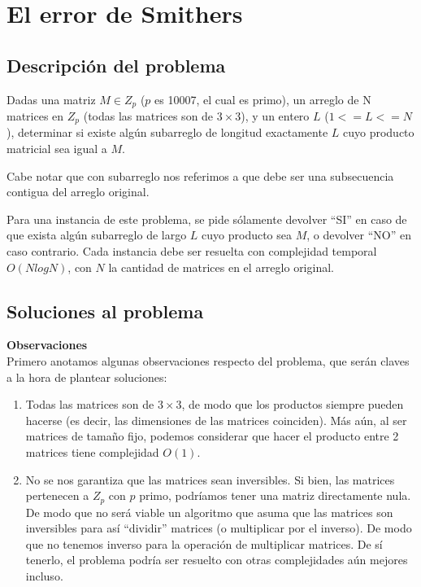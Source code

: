 \newpage{}
\section{El error de Smithers}
\subsection{Descripción del problema}
Dadas una matriz $M\in Z_p$ ($p$ es 10007, el cual es primo), un arreglo 
de N matrices en $Z_p$ (todas las matrices son de $3 \times 3$), 
y un entero $L$ ($1 <= L <= N$), determinar si existe algún subarreglo 
de longitud exactamente $L$ cuyo producto matricial 
sea igual a $M$. 

Cabe notar que con subarreglo nos referimos a que debe ser una 
subsecuencia contigua del arreglo original. 

Para una instancia de este problema, se pide sólamente devolver ``SI'' en 
caso de que exista algún subarreglo de largo $L$ cuyo producto sea $M$, o devolver 
``NO'' en caso contrario. Cada instancia debe ser resuelta con complejidad temporal 
$O(N log N)$, con $N$ 
la cantidad de matrices en el arreglo original. 

\subsection{Soluciones al problema}
\textbf{Observaciones}\\

Primero anotamos algunas observaciones respecto del problema, que serán claves a la
hora de plantear soluciones: 
\begin{enumerate}
    \item Todas las matrices son de $3 \times 3$, de modo que los productos siempre pueden 
    hacerse (es decir, las dimensiones de las matrices coinciden). Más aún, al ser matrices 
    de tamaño fijo, podemos considerar que hacer el producto entre 2 matrices tiene 
    complejidad $O(1)$. 
    \item No se nos garantiza que las matrices sean inversibles. Si bien, las matrices 
    pertenecen a $Z_p$ con $p$ primo, podríamos tener una matriz directamente nula. 
    De modo que no será viable un algoritmo que asuma que las matrices son inversibles para 
    así ``dividir'' matrices (o multiplicar por el inverso). De modo que no tenemos inverso para la 
    operación de multiplicar matrices. De sí tenerlo, el problema podría ser resuelto con 
    otras complejidades aún mejores incluso. 
\end{enumerate}

